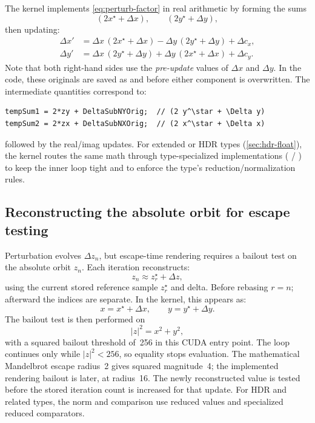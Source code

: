 The kernel implements \cref{eq:perturb-factor} in real arithmetic by forming
the sums
\[
(2x^\star + \Delta x),\qquad (2y^\star + \Delta y),
\]
then updating:
\begin{align}
\Delta x' &= \Delta x\,(2x^\star + \Delta x) - \Delta y\,(2y^\star + \Delta y) + \Delta c_x, \\
\Delta y' &= \Delta x\,(2y^\star + \Delta y) + \Delta y\,(2x^\star + \Delta x) + \Delta c_y.
\end{align}
Note that both right-hand sides use the \emph{pre-update} values of
\(\Delta x\) and \(\Delta y\).  In the code, these originals are saved as
 and  before either component is
overwritten.  The intermediate quantities correspond to:
\begin{lstlisting}
tempSum1 = 2*zy + DeltaSubNYOrig;  // (2 y^\star + \Delta y)
tempSum2 = 2*zx + DeltaSubNXOrig;  // (2 x^\star + \Delta x)
\end{lstlisting}
followed by the real/imag updates. For extended or HDR types (\cref{sec:hdr-float}), the kernel routes
the same math through type-specialized implementations
( / ) to keep the inner loop
tight and to enforce the type's reduction/normalization rules.

\subsection{Reconstructing the absolute orbit for escape testing}
\label{sec:perturb-only-reconstruct}

Perturbation evolves \(\Delta z_n\), but escape-time rendering requires a
bailout test on the absolute orbit \(z_n\). Each iteration reconstructs:
\[
z_n \approx z_r^\star + \Delta z,
\]
using the current stored reference sample \(z_r^\star\) and delta. Before
rebasing $r=n$; afterward the indices are separate. In the
kernel, this appears as:
\[
x = x^\star + \Delta x,\qquad y = y^\star + \Delta y.
\]
The bailout test is then performed on
\[
|z|^2 = x^2 + y^2,
\]
with a squared bailout threshold of~256 in this CUDA entry point.
The loop continues only while $|z|^2<256$, so equality stops evaluation.
The mathematical Mandelbrot escape radius~2 gives squared magnitude~4;
the implemented rendering bailout is later, at radius~16. The newly
reconstructed value is tested before the stored iteration count is
increased for that update. For HDR and related types, the norm and
comparison use reduced values and specialized reduced comparators.

